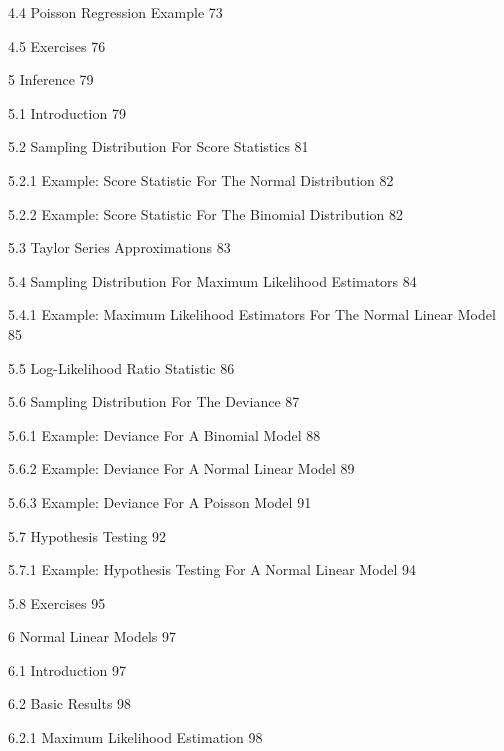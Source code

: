4.4 Poisson Regression Example 73



4.5 Exercises 76



5 Inference 79



5.1 Introduction 79



5.2 Sampling Distribution For Score Statistics 81



5.2.1 Example: Score Statistic For The Normal Distribution 82



5.2.2 Example: Score Statistic For The Binomial Distribution 82



5.3 Taylor Series Approximations 83



5.4 Sampling Distribution For Maximum Likelihood Estimators 84



5.4.1 Example: Maximum Likelihood Estimators For The Normal Linear Model 85



5.5 Log-Likelihood Ratio Statistic 86



5.6 Sampling Distribution For The Deviance 87



5.6.1 Example: Deviance For A Binomial Model 88



5.6.2 Example: Deviance For A Normal Linear Model 89



5.6.3 Example: Deviance For A Poisson Model 91



5.7 Hypothesis Testing 92



5.7.1 Example: Hypothesis Testing For A Normal Linear Model 94



5.8 Exercises 95



6 Normal Linear Models 97



6.1 Introduction 97



6.2 Basic Results 98



6.2.1 Maximum Likelihood Estimation 98



